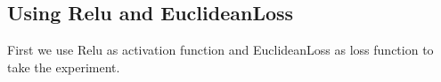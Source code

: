 \documentclass{elegantbook}
\begin{document}

\subsection{Using Relu and EuclideanLoss}
First we use Relu as activation function and EuclideanLoss as loss function to take the experiment.
\end{document}
